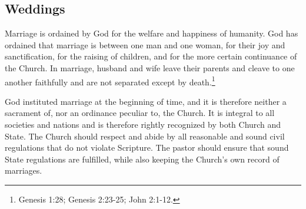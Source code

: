 \begin{outerlst}[left=0pt,labelsep=0pt]
\subsection{Weddings}  

\begin{innerlst}[resume*]
      \item Marriage is ordained by God for the welfare and happiness of humanity. God has ordained that marriage is between one man and one woman, for their joy and sanctification, for the raising of children, and for the more certain continuance of the Church. In marriage, husband and wife leave their parents and cleave to one another faithfully and are not separated except by death.\footnote{Genesis 1:28; Genesis 2:23-25; John 2:1-12.} 
      \item God instituted marriage at the beginning of time, and it is therefore neither a sacrament of, nor an ordinance peculiar to, the Church. It is integral to all societies and nations and is therefore rightly recognized by both Church and State. The Church should respect and abide by all reasonable and sound civil regulations that do not violate Scripture. The pastor should ensure that sound State regulations are fulfilled, while also keeping the Church's own record of marriages.  

\end{innerlst}
\end{outerlst}
